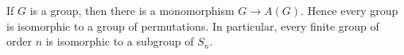 If $G$ is a group, then there is a monomorphism $G \to A(G)$. Hence every group is isomorphic to a group of permutations. In particular, every finite group of order $n$ is isomorphic to a subgroup of $S_n$.
